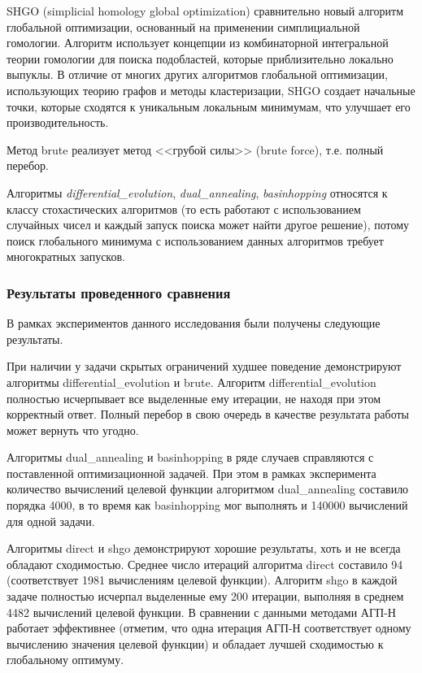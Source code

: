 \documentclass[a4paper,12pt,russian]{article}
\begin{document}
SHGO (simplicial homology global optimization) сравнительно новый алгоритм глобальной оптимизации, основанный на применении симплициальной гомологии. Алгоритм использует концепции из комбинаторной интегральной теории гомологии для поиска подобластей, которые приблизительно локально выпуклы. В отличие от многих других алгоритмов глобальной оптимизации, использующих теорию графов и методы кластеризации, SHGO создает начальные точки, которые сходятся к уникальным локальным минимумам, что улучшает его производительность.

Метод brute реализует метод <<грубой силы>> (brute force), т.е. полный перебор.

Алгоритмы \textit{differential\_evolution}, \textit{dual\_annealing}, \textit{basinhopping} относятся к классу стохастических алгоритмов (то есть работают с использованием случайных чисел и каждый запуск поиска может найти другое решение), потому поиск глобального минимума с использованием данных алгоритмов требует многократных запусков.

\subsubsection{Результаты проведенного сравнения}

В рамках экспериментов данного исследования были получены следующие результаты.

При наличии у задачи скрытых ограничений худшее поведение демонстрируют алгоритмы differential\_evolution и brute. Алгоритм differential\_evolution полностью исчерпывает все выделенные ему итерации, не находя при этом корректный ответ. Полный перебор в свою очередь в качестве результата работы может вернуть что угодно. 

Алгоритмы dual\_annealing и basinhopping в ряде случаев справляются с поставленной оптимизационной задачей. При этом в рамках эксперимента количество вычислений целевой функции алгоритмом dual\_annealing составило порядка 4000, в то время как basinhopping мог выполнять и 140000 вычислений для одной задачи.

Алгоритмы direct и shgo демонстрируют хорошие результаты, хоть и не всегда обладают сходимостью. Среднее число итераций алгоритма direct составило 94 (соответствует 1981 вычислениям целевой функции). Алгоритм shgo в каждой задаче полностью исчерпал выделенные ему 200 итерации, выполняя в среднем 4482 вычислений целевой функции. В сравнении с данными методами АГП-Н работает эффективнее (отметим, что одна итерация АГП-Н соответствует одному вычислению значения целевой функции) и обладает лучшей сходимостью к глобальному оптимуму.
\end{document}
